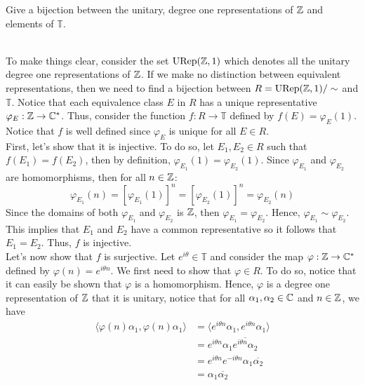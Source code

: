 \begin{exercise}
    Give a bijection between the unitary, degree one representations of $\mathbb{Z}$ and elements of $\mathbb{T}$.\\
\end{exercise}

\begin{solution}
    \\ To make things clear, consider the set $\text{URep}(\mathbb{Z}, 1)$ which denotes all the unitary degree one representations of $\mathbb{Z}$. If we make no distinction between equivalent representations, then we need to find a bijection between $R = \text{URep}(\mathbb{Z}, 1) / \sim$ and $\mathbb{T}$. Notice that each equivalence class $E$ in $R$ has a unique representative $\varphi_E : \mathbb{Z} \to \mathbb{C}^*$. Thus, consider the function $f : R \to \mathbb{T}$ defined by $f(E) = \varphi_E(1)$. Notice that $f$ is well defined since $\varphi_E$ is unique for all $E \in R$. \\
    First, let's show that it is injective. To do so, let $E_1, E_2 \in R$ such that $f(E_1) = f(E_2)$, then by definition, $\varphi_{E_1}(1) = \varphi_{E_2}(1)$. Since $\varphi_{E_1}$ and $\varphi_{E_2}$ are homomorphisms, then for all $n \in \mathbb{Z}$:
    $$\varphi_{E_1}(n) = [\varphi_{E_1}(1)]^n = [\varphi_{E_2}(1)]^n = \varphi_{E_2}(n) $$
    Since the domains of both $\varphi_{E_1}$ and $\varphi_{E_2}$ is $\mathbb{Z}$, then $\varphi_{E_1} = \varphi_{E_2}$. Hence, $\varphi_{E_1} \sim \varphi_{E_2}$. This implies that $E_1$ and $E_2$ have a common representative so it follows that $E_1 = E_2$. Thus, $f$ is injective.\\
    Let's now show that $f$ is surjective. Let $e^{i\theta} \in \mathbb{T}$ and consider the map $\varphi : \mathbb{Z} \to \mathbb{C}^*$ defined by $\varphi(n) = e^{i\theta n}$. We first need to show that $\varphi \in R$. To do so, notice that it can easily be shown that $\varphi$ is a homomorphism. Hence, $\varphi$ is a degree one representation of $\mathbb{Z}$ that it is unitary, notice that for all $\alpha_1, \alpha_2 \in \mathbb{C}$ and $n \in \mathbb{Z}$, we have
    \begin{align*}
        \langle \varphi(n) \alpha_1, \varphi(n) \alpha_1\rangle &= \langle e^{i\theta n} \alpha_1, e^{i \theta n} \alpha_1\rangle \\
        &= e^{i\theta n} \alpha_1 \overline{e^{i\theta n} \alpha_2} \\
        &= e^{i\theta n} e^{-i\theta n} \alpha_1 \overline{\alpha_2} \\
        &= \alpha_1 \overline{\alpha_2} \\

\end{align*}
\end{solution}
